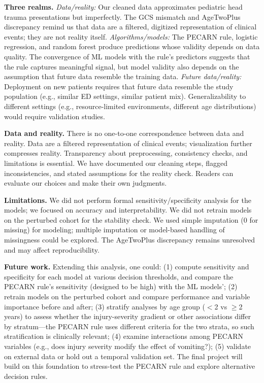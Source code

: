 \documentclass[10pt,letterpaper]{article}
\begin{document}
\textbf{Three realms.} \textit{Data/reality:} Our cleaned data approximates pediatric head trauma presentations but imperfectly. The GCS mismatch and AgeTwoPlus discrepancy remind us that data are a filtered, digitized representation of clinical events; they are not reality itself. \textit{Algorithms/models:} The PECARN rule, logistic regression, and random forest produce predictions whose validity depends on data quality. The convergence of ML models with the rule's predictors suggests that the rule captures meaningful signal, but model validity also depends on the assumption that future data resemble the training data. \textit{Future data/reality:} Deployment on new patients requires that future data resemble the study population (e.g., similar ED settings, similar patient mix). Generalizability to different settings (e.g., resource-limited environments, different age distributions) would require validation studies.

\textbf{Data and reality.} There is no one-to-one correspondence between data and reality. Data are a filtered representation of clinical events; visualization further compresses reality. Transparency about preprocessing, consistency checks, and limitations is essential. We have documented our cleaning steps, flagged inconsistencies, and stated assumptions for the reality check. Readers can evaluate our choices and make their own judgments.

\textbf{Limitations.} We did not perform formal sensitivity/specificity analysis for the models; we focused on accuracy and interpretability. We did not retrain models on the perturbed cohort for the stability check. We used simple imputation (0 for missing) for modeling; multiple imputation or model-based handling of missingness could be explored. The AgeTwoPlus discrepancy remains unresolved and may affect reproducibility.

\textbf{Future work.} Extending this analysis, one could: (1) compute sensitivity and specificity for each model at various decision thresholds, and compare the PECARN rule's sensitivity (designed to be high) with the ML models'; (2) retrain models on the perturbed cohort and compare performance and variable importance before and after; (3) stratify analyses by age group ($<$2 vs $\ge$2 years) to assess whether the injury-severity gradient or other associations differ by stratum---the PECARN rule uses different criteria for the two strata, so such stratification is clinically relevant; (4) examine interactions among PECARN variables (e.g., does injury severity modify the effect of vomiting?); (5) validate on external data or hold out a temporal validation set. The final project will build on this foundation to stress-test the PECARN rule and explore alternative decision rules.
\end{document}
